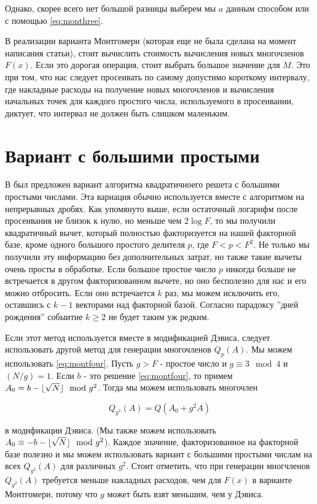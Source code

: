 \documentclass[a4paper,12pt]{report}
\DeclarePairedDelimiter\floor{\lfloor}{\rfloor}
\begin{document}
Однако, скорее всего нет большой разницы выберем мы $a$ данным способом или с помощью \eqref{eq:monthree}.

В реализации варианта Монтгомери (которая еще не была сделана на момент написания статьи), стоит вычислить стоимость вычисления новых многочленов $F(x)$. Если это дорогая операция, стоит выбрать большое значение для $M$. Это при том, что нас следует просеивать по самому допустимо короткому интервалу, где накладные расходы на получение новых многочленов и вычисления начальных точек для каждого простого числа, используемого в просеивании, диктует, что интервал не должен быть слишком маленьким.

\section{Вариант с большими простыми}
В \cite{pomer} был предложен вариант алгоритма квадратичноего решета с большими простыми числами. Эта вариация обычно используется вместе с алгоритмом на непрерывных дробях. Как упомянуто выше, если остаточный логарифм после просеивания не близок к нулю, но меньше чем $2 \log{F}$, то мы получили квадратичный вычет, который полностью факторизуется на нашей факторной базе, кроме одного большого простого делителя $p$, где $F < p < F^2$. Не только мы получили эту информацию без дополнительных затрат, но также такие вычеты очень просты в обработке. Если большое простое число $p$ никогда больше не встречается в другом факторизованном вычете, но оно бесполезно для нас и его можно отбросить. Если оно встречается $k$ раз, мы можем исключить его, оставшись с $k-1$ векторами над факторной базой. Согласно парадоксу ''дней рождения'' собыитие $k \geq 2$ не будет таким уж редким.

Если этот метод используется вместе в модификацией Дэвиса, следует использовать другой метод для генерации многочленов $Q_p(A)$. Мы можем использовать \eqref{eq:montfour}. Пусть $g > F$ - простое число и $g \equiv 3 \mod 4$ и $(N/g) = 1$. Если $b$ - это решение \eqref{eq:montfour}, то примем $A_0 = b- \floor{\sqrt{N}} \mod g^2$. Тогда мы можем использовать многочлен

\begin{equation*}
Q_{g^2}(A) = Q(A_0 + g^2A)
\end{equation*}

в модификации Дэвиса. (Мы также можем использовать $A_0 \equiv -b -\floor{\sqrt{N}} \mod g^2$).
Каждое значение, факторизованное на факторной базе полезно и мы можем использовать вариант с большими простыми числам на всех $Q_{g^2}(A)$ для различных $g^2$. Стоит отметить, что при генерации многчленов $Q_{g^2}(A)$ требуется меньше накладных расходов, чем для $F(x)$  в варианте Монтгомери, потому что $g$ может быть взят меньшим, чем у Дэвиса.
\end{document}
